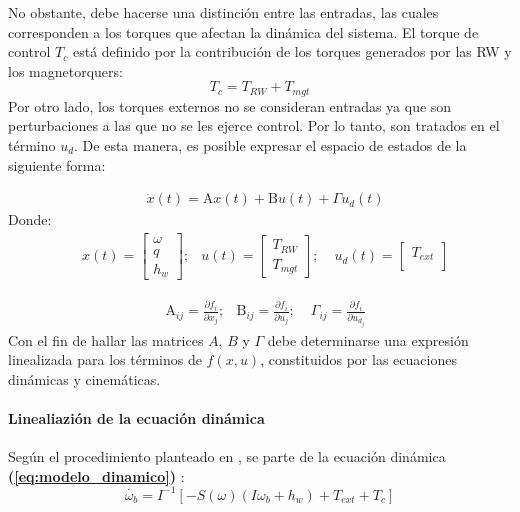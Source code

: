 No obstante, debe hacerse una distinción entre las entradas, las cuales corresponden a los torques que afectan la dinámica del sistema. El torque de control $T_c$ está definido por la contribución de los torques generados por las RW y los magnetorquers:
$$ T_c = T_{RW} +T_{mgt}$$
Por otro lado, los torques externos no se consideran entradas ya que son perturbaciones a las que no se les ejerce control. Por lo tanto, son tratados en el término $u_d$. De esta manera, es posible expresar el espacio de estados de la siguiente forma:
 
\begin{equation}
	\begin{aligned}
		& \dot{x}(t) =\mathrm{A}x(t)+ \mathrm{B}u(t)+ \Gamma u_d(t)
	\end{aligned}
\end{equation}	
\noindent Donde: 
\begin{equation}
	\begin{aligned}
		& x(t) = \left[\begin{array}{c}
			\omega \\
			q \\
			h_{w}
		\end{array}\right];
		& u(t) = \left[\begin{array}{c}
			T_{RW} \\
			T_{mgt}
		\end{array}\right]; 
		&\;u_d(t) = \left[\begin{array}{c}
			T_{ext} \\		
		\end{array}\right]		
	\end{aligned}
\end{equation}

\begin{equation}
	\begin{aligned}		
		&\mathrm{A}_{ij}= \frac{\partial f_i}{\partial x_j};	
		&\mathrm{B}_{ij}= \frac{\partial f_i}{\partial u_j};	
		&\;\Gamma_{ij}= \frac{\partial f_i}{\partial u_{d_j}}		
	\end{aligned}
\end{equation}
Con el fin de hallar las matrices $A$, $B$ y $\Gamma$ debe determinarse una expresión linealizada para los términos de $f(x,u)$, constituidos por las ecuaciones dinámicas y cinemáticas.

\paragraph{Linealiazión de la ecuación dinámica}
\hfill \break
Según el procedimiento planteado en \cite{Andresen2005}, se parte de la ecuación dinámica \textbf{(\ref{eq:modelo_dinamico})} :
$$
 \dot{\omega_b}=I^{-1}\left[-S(\omega)\left(I \omega_b+h_w\right)+T_{ext}+T_c\right]
$$

